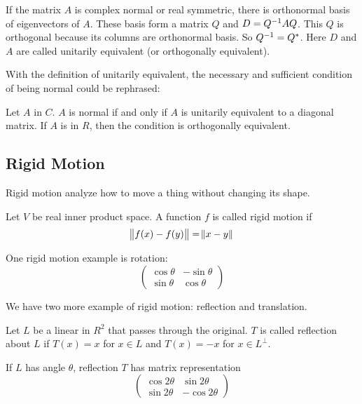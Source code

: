 If the matrix $A$ is complex normal or real symmetric, there is orthonormal basis of eigenvectors of $A$. These basis form a matrix $Q$ and $D = {Q}^{-1} A Q$. This $Q$ is orthogonal because its columns are orthonormal basis. So ${Q}^{-1} = Q^*$. Here $D$ and $A$ are called unitarily equivalent (or orthogonally equivalent).

With the definition of unitarily equivalent, the necessary and sufficient condition of being normal could be rephrased:
\begin{theorem}
    Let $A$ in $C$. $A$ is normal if and only if $A$ is unitarily equivalent to a diagonal matrix. If $A$ is in $R$, then the condition is orthogonally equivalent.
\end{theorem}




\subsection{Rigid Motion}

Rigid motion analyze how to move a thing without changing its shape.

\begin{definition}
    Let $V$ be real inner product space. A function $f$ is called rigid motion if 
    \begin{equation}
        \norm{f(x) - f(y)} = \norm{x - y}
    \end{equation}
\end{definition}

One rigid motion example is rotation:
\begin{equation}
    \begin{pmatrix}
        \cos \theta & - \sin \theta \\
        \sin \theta & \cos \theta
    \end{pmatrix}
\end{equation}


We have two more example of rigid motion: reflection and translation.

\begin{definition}[Reflection]
    Let $L$ be a linear in $R^2$ that passes through the original. $T$ is called reflection about $L$ if $T(x) = x$ for $x \in L$ and $T(x) = -x$ for $x \in L^\perp$.
\end{definition}

If $L$ has angle $\theta$, reflection $T$ has matrix representation 
\begin{equation}
    \begin{pmatrix}
        \cos 2\theta & \sin 2\theta \\
        \sin 2\theta & -\cos 2\theta
    \end{pmatrix}
\end{equation}

